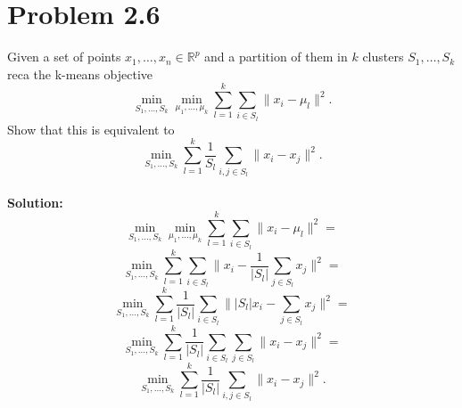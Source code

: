 \documentclass{amsart}
\begin{document}
	\section{Problem 2.6}
	Given a set of points $x_1,\dots,x_n \in \mathbb{R}^p$ and a partition of them in $k$ clusters $S_1,\dots,S_k$ reca the k-means objective
	\[
	\min_{S_1,\dots,S_k}\min_{\mu_1,\dots,\mu_k}\sum_{l=1}^{k}\sum_{i\in S_l}\| x_i - \mu_l \|^2.
	\]
	Show that this is equivalent to 
	\[
	\min_{S_1,\dots,S_k}\sum_{l=1}^{k}\frac{1}{S_l}\sum_{i,j\in S_l}\| x_i - x_j \|^2.
	\]
	\\
	\textbf{Solution:}
	\[
	\min_{S_1,\dots,S_k}\min_{\mu_1,\dots,\mu_k}\sum_{l=1}^{k}\sum_{i\in S_l}\| x_i - \mu_l \|^2 =
	\]
	\[
	\min_{S_1,\dots,S_k}\sum_{l=1}^{k}\sum_{i\in S_l}\|x_i - \frac{1}{|S_l|}\sum_{j\in S_l}x_j\|^2 =
	\]
	\[
	\min_{S_1,\dots,S_k}\sum_{l=1}^{k}\frac{1}{|S_l|}\sum_{i\in S_l}\| |S_l|x_i - \sum_{j\in S_l}x_j\|^2 =
	\]
	\[
	\min_{S_1,\dots,S_k}\sum_{l=1}^{k}\frac{1}{|S_l|}\sum_{i\in S_l}\sum_{j\in S_l}\| x_i - x_j\|^2 =
	\]
	\[
	\min_{S_1,\dots,S_k}\sum_{l=1}^{k}\frac{1}{|S_l|}\sum_{i,j\in S_l}\| x_i - x_j\|^2.
	\]
	
	
\end{document}
